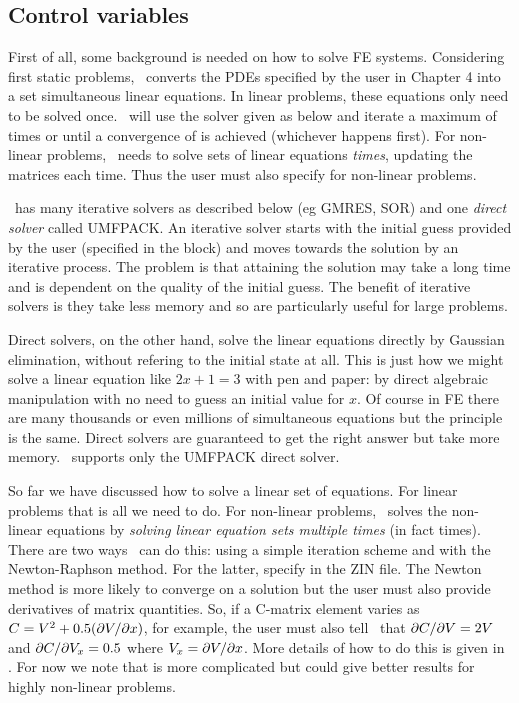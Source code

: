 \documentclass[a4paper,twoside,11pt]{book}
\begin{document}
\subsection{Control variables}
\label{zinctrl}

First of all, some background is needed on how to solve FE
systems. Considering first static problems, \zinc\ converts the PDEs
specified by the user in Chapter 4 into a set simultaneous linear
equations. In linear problems, these equations only need to be solved
once. \zinc\ will use the solver given as  below and
iterate a maximum of  times or until a convergence of
 is achieved (whichever happens first). For non-linear
problems, \zinc\ needs to solve sets of linear equations \emph{
times}, updating the matrices each time. Thus the user must also
specify  for non-linear problems.

\zinc\ has many iterative solvers as described below (eg GMRES, SOR) and one
\emph{direct solver} called UMFPACK. An iterative solver starts with
the initial guess provided by the user (specified in the 
block) and moves towards the solution by an iterative process. The
problem is that attaining the solution may take a long time and is
dependent on the quality of the initial guess. The benefit of
iterative solvers is they take less memory and so are particularly useful
for large problems.

Direct solvers, on the other hand, solve the linear equations directly
by Gaussian elimination, without refering to the initial state at
all. This is just how we might solve a linear equation like $2x+1=3$
with pen and paper: by direct algebraic manipulation with no need to
guess an initial value for $x$. Of course in FE there are many
thousands or even millions of simultaneous equations but the principle
is the same. Direct solvers are guaranteed to get the right answer but
take more memory. \zinc\ supports only the UMFPACK direct solver.

So far we have discussed how to solve a linear set of equations. For
linear problems that is all we need to do. For non-linear problems,
\zinc\ solves the non-linear equations by \emph{solving linear equation sets
multiple times} (in fact  times). There are two ways
\zinc\ can do this: using a simple iteration scheme and with the
Newton-Raphson method. For the latter, specify  in the ZIN
file. The Newton method is more likely to converge on a solution but
the user must also provide derivatives of matrix quantities. So, if a C-matrix
element varies as $C=V^2+0.5(\partial V/\partial x)$, for example, the user must
also tell \zinc\ that $\partial C/\partial V = 2V$ and $\partial C/\partial V_x=0.5$ where
$V_x=\partial V/\partial x$. More details of how to do this is given in . For
now we note that  is more complicated but could give
better results for highly non-linear problems.
\end{document}
